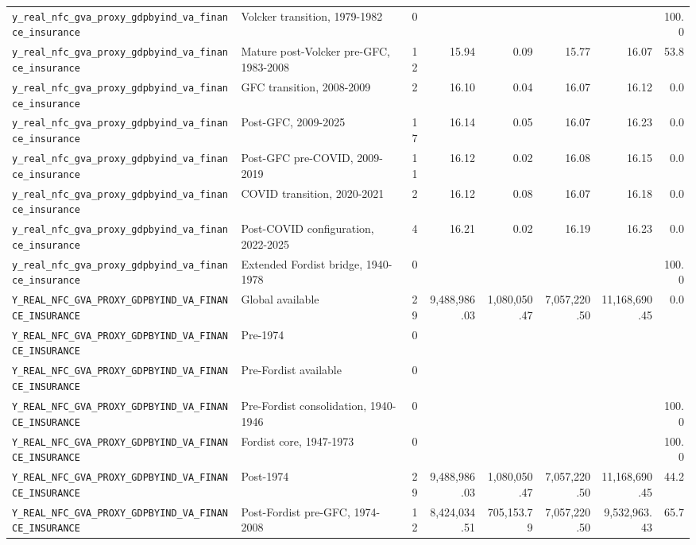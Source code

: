 \begin{landscape}
\begin{longtable}{p{4.4cm}p{3.8cm}rrrrrr}
\\
\nolinkurl{y_real_nfc_gva_proxy_gdpbyind_va_finance_insurance} & Volcker transition, 1979-1982 & 0 &  &  &  &  & 100.0
\\
\nolinkurl{y_real_nfc_gva_proxy_gdpbyind_va_finance_insurance} & Mature post-Volcker pre-GFC, 1983-2008 & 12 & 15.94 & 0.09 & 15.77 & 16.07 & 53.8
\\
\nolinkurl{y_real_nfc_gva_proxy_gdpbyind_va_finance_insurance} & GFC transition, 2008-2009 & 2 & 16.10 & 0.04 & 16.07 & 16.12 & 0.0
\\
\nolinkurl{y_real_nfc_gva_proxy_gdpbyind_va_finance_insurance} & Post-GFC, 2009-2025 & 17 & 16.14 & 0.05 & 16.07 & 16.23 & 0.0
\\
\nolinkurl{y_real_nfc_gva_proxy_gdpbyind_va_finance_insurance} & Post-GFC pre-COVID, 2009-2019 & 11 & 16.12 & 0.02 & 16.08 & 16.15 & 0.0
\\
\nolinkurl{y_real_nfc_gva_proxy_gdpbyind_va_finance_insurance} & COVID transition, 2020-2021 & 2 & 16.12 & 0.08 & 16.07 & 16.18 & 0.0
\\
\nolinkurl{y_real_nfc_gva_proxy_gdpbyind_va_finance_insurance} & Post-COVID configuration, 2022-2025 & 4 & 16.21 & 0.02 & 16.19 & 16.23 & 0.0
\\
\nolinkurl{y_real_nfc_gva_proxy_gdpbyind_va_finance_insurance} & Extended Fordist bridge, 1940-1978 & 0 &  &  &  &  & 100.0
\\
\nolinkurl{Y_REAL_NFC_GVA_PROXY_GDPBYIND_VA_FINANCE_INSURANCE} & Global available & 29 & 9,488,986.03 & 1,080,050.47 & 7,057,220.50 & 11,168,690.45 & 0.0
\\
\nolinkurl{Y_REAL_NFC_GVA_PROXY_GDPBYIND_VA_FINANCE_INSURANCE} & Pre-1974 & 0 &  &  &  &  &
\\
\nolinkurl{Y_REAL_NFC_GVA_PROXY_GDPBYIND_VA_FINANCE_INSURANCE} & Pre-Fordist available & 0 &  &  &  &  &
\\
\nolinkurl{Y_REAL_NFC_GVA_PROXY_GDPBYIND_VA_FINANCE_INSURANCE} & Pre-Fordist consolidation, 1940-1946 & 0 &  &  &  &  & 100.0
\\
\nolinkurl{Y_REAL_NFC_GVA_PROXY_GDPBYIND_VA_FINANCE_INSURANCE} & Fordist core, 1947-1973 & 0 &  &  &  &  & 100.0
\\
\nolinkurl{Y_REAL_NFC_GVA_PROXY_GDPBYIND_VA_FINANCE_INSURANCE} & Post-1974 & 29 & 9,488,986.03 & 1,080,050.47 & 7,057,220.50 & 11,168,690.45 & 44.2
\\
\nolinkurl{Y_REAL_NFC_GVA_PROXY_GDPBYIND_VA_FINANCE_INSURANCE} & Post-Fordist pre-GFC, 1974-2008 & 12 & 8,424,034.51 & 705,153.79 & 7,057,220.50 & 9,532,963.43 & 65.7

\end{longtable}
\end{landscape}
